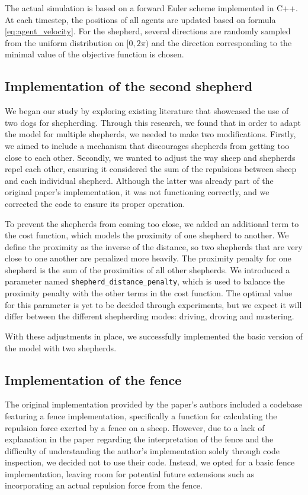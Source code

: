 The actual simulation is based on a forward Euler scheme implemented in C++. At each timestep, the positions of all agents are updated based on formula \ref{eq:agent_velocity}. For the shepherd, several directions are randomly sampled from the uniform distribution on $[0, 2\pi)$ and the direction corresponding to the minimal value of the objective function is chosen. 

\subsection{Implementation of the second shepherd}
We began our study by exploring existing literature that showcased the use of two dogs for shepherding. Through this research, we found that in order to adapt the model for multiple shepherds, we needed to make two modifications. Firstly, we aimed to include a mechanism that discourages shepherds from getting too close to each other. Secondly, we wanted to adjust the way sheep and shepherds repel each other, ensuring it considered the sum of the repulsions between sheep and each individual shepherd. Although the latter was already part of the original paper's implementation, it was not functioning correctly, and we corrected the code to ensure its proper operation.

To prevent the shepherds from coming too close, we added an additional term to the cost function, which models the proximity of one shepherd to another. We define the proximity as the inverse of the distance, so two shepherds that are very close to one another are penalized more heavily. The proximity penalty for one shepherd is the sum of the proximities of all other shepherds. We introduced a parameter named \texttt{shepherd\_distance\_penalty}, which is used to balance the proximity penalty with the other terms in the cost function. The optimal value for this parameter is yet to be decided through experiments, but we expect it will differ between the different shepherding modes: driving, droving and mustering.

With these adjustments in place, we successfully implemented the basic version of the model with two shepherds.


\subsection{Implementation of the fence}
The original implementation provided by the paper's authors included a codebase featuring a fence implementation, specifically a function for calculating the repulsion force exerted by a fence on a sheep. However, due to a lack of explanation in the paper regarding the interpretation of the fence and the difficulty of understanding the author's implementation solely through code inspection, we decided not to use their code. Instead, we opted for a basic fence implementation, leaving room for potential future extensions such as incorporating an actual repulsion force from the fence.

